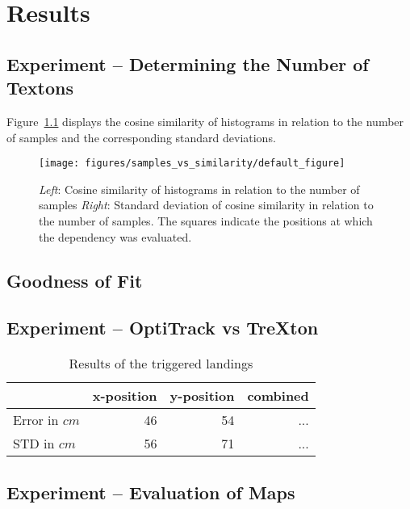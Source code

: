 \chapter{Results}
\label{chap:results}

\section{Experiment -- Determining the Number of Textons}

Figure~\ref{fig:cosine} displays the cosine similarity of histograms
in relation to the number of samples and the corresponding standard
deviations.

\begin{figure}[h!]
\begin{center}
\texttt{[image: figures/samples\_vs\_similarity/default\_figure]}
\caption{{\label{fig:cosine} \emph{Left}:
    Cosine similarity of histograms in relation to the number of
    samples \emph{Right}: Standard deviation of cosine similarity in
    relation to the number of samples. The squares indicate the
    positions at which the dependency was evaluated.%
}}
\end{center}
\end{figure}

\section{Goodness of Fit}

\section{Experiment -- OptiTrack vs TreXton}
\label{sec:experiment-2}

\begin{table}[H]
  \centering
  \begin{tabular}{lrrr}
    \toprule
    & x-position & y-position & combined\\
    \midrule
    Error in $cm$ & 46 & 54 & ...\\
    STD in $cm$ & 56 & 71  & ...\\
    \bottomrule
  \end{tabular}
  \caption[Triggered landings]{Results of the triggered landings}
  \label{tab:targetlanding}

\end{table}

\section{Experiment -- Evaluation of Maps}
\label{sec:experiment-3}

